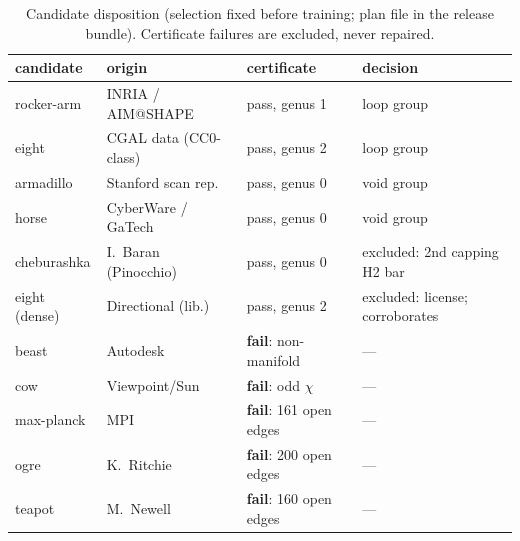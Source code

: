 \begin{table}[t]
\centering
\caption{Candidate disposition (selection fixed before training;
plan file in the release bundle). Certificate failures are excluded,
never repaired.}
\label{tab:gwdisp}
\scriptsize
\setlength{\tabcolsep}{3pt}
\begin{tabular}{llll}
\toprule
candidate & origin & certificate & decision \\
\midrule
rocker-arm & INRIA / AIM@SHAPE & pass, genus 1 & loop group \\
eight & CGAL data (CC0-class) & pass, genus 2 & loop group \\
armadillo & Stanford scan rep. & pass, genus 0 & void group \\
horse & CyberWare / GaTech & pass, genus 0 & void group \\
cheburashka & I.~Baran (Pinocchio) & pass, genus 0 & excluded: 2nd capping H2 bar \\
eight (dense) & Directional (lib.) & pass, genus 2 & excluded: license; corroborates \\
beast & Autodesk & \textbf{fail}: non-manifold & --- \\
cow & Viewpoint/Sun & \textbf{fail}: odd $\chi$ & --- \\
max-planck & MPI & \textbf{fail}: 161 open edges & --- \\
ogre & K.~Ritchie & \textbf{fail}: 200 open edges & --- \\
teapot & M.~Newell & \textbf{fail}: 160 open edges & --- \\
\bottomrule
\end{tabular}
\end{table}
